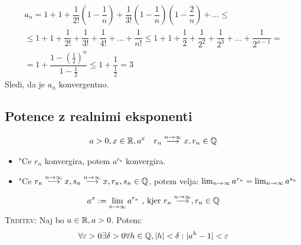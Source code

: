 \begin{multline*}
a_n = 1 + 1 + \dfrac{1}{2!} (1 - \dfrac{1}{n}) + \dfrac{1}{3!} (1 - \dfrac{1}{n}) (1 - \dfrac{2}{n}) + \ldots \leq \\
\leq 1 + 1 + \dfrac{1}{2!} + \dfrac{1}{3!} + \dfrac{1}{4!} + \ldots + \dfrac{1}{n!} \leq 1 + 1 + \dfrac{1}{2} + \dfrac{1}{2^2} + \dfrac{1}{2^3} + \ldots + \dfrac{1}{2^{n-1}}  = \\
= 1 + \dfrac{1 - \left(\frac{1}{2}\right)^n}{1 - \frac{1}{2}} \leq 1 + \dfrac{1}{\frac{1}{2}} = 3
\end{multline*}
Sledi, da je $a_n$ konvergentno.

\subsection{Potence z realnimi eksponenti}
\begin{align*}
a > 0, x \in \mathbb{R}, a^x && r_n \stackrel{n \to \infty}{\longrightarrow} x, r_n \in \mathbb{Q}
\end{align*}
\begin{itemize}
	\item "Ce $r_n$ konvergira, potem $a^{r_n}$ konvergira.
	\item "Ce $r_n \stackrel{n\to \infty}{\longrightarrow} x, s_n \stackrel{n\to \infty}{\longrightarrow} x, r_n, s_n \in \mathbb{Q}$, potem velja: $\lim_{n \rightarrow \infty} a^{r_n} = \lim_{n \rightarrow \infty} a^{s_n}$
\end{itemize}
\begin{equation*}
a^x := \lim_{n \rightarrow \infty} a^{r_n} \text{ , kjer } r_n \stackrel{n\to \infty}{\longrightarrow}, r_n \in \mathbb{Q}
\end{equation*}
\textsc{Trditev:} Naj bo $a \in \mathbb{R}, a > 0$. Potem:
\begin{equation*}
\forall \varepsilon > 0 \exists \delta > 0 \forall h \in \mathbb{Q}, |h| < \delta: |a^h - 1| < \varepsilon
\end{equation*}